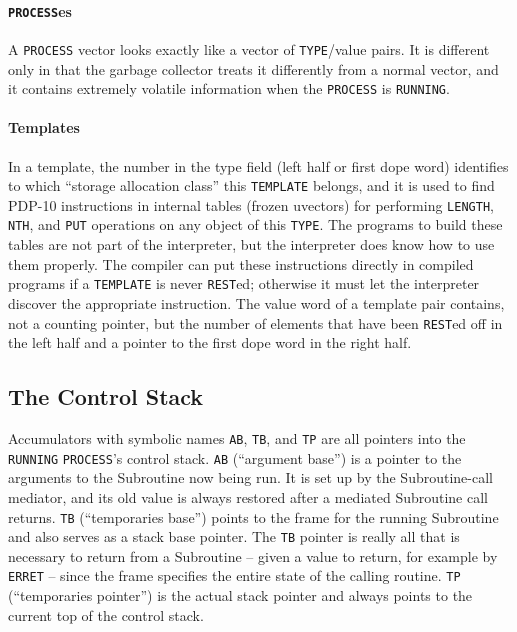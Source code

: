 \documentclass[a4paper,]{article}
\let\oldparagraph\paragraph
\renewcommand{\paragraph}[1]{\oldparagraph{#1}\mbox{}}
\begin{document}
\paragraph{\texorpdfstring{\texttt{PROCESS}es}{PROCESSes}}\label{processes}

A \texttt{PROCESS} vector looks exactly like a vector of \texttt{TYPE}/value pairs. It is different only in that the
garbage collector treats it differently from a normal vector, and it contains extremely volatile information when the
\texttt{PROCESS} is \texttt{RUNNING}.

\paragraph{Templates}\label{templates}

In a template, the number in the type field (left half or first dope word) identifies to which ``storage allocation class''
this \texttt{TEMPLATE} belongs, and it is used to find PDP-10 instructions in internal tables (frozen uvectors) for
performing \texttt{LENGTH}, \texttt{NTH}, and \texttt{PUT} operations on any object of this \texttt{TYPE}. The programs to
build these tables are not part of the interpreter, but the interpreter does know how to use them properly. The compiler
can put these instructions directly in compiled programs if a \texttt{TEMPLATE} is never \texttt{REST}ed; otherwise it must
let the interpreter discover the appropriate instruction. The value word of a template pair contains, not a counting
pointer, but the number of elements that have been \texttt{REST}ed off in the left half and a pointer to the first dope
word in the right half.

\subsection{The Control Stack}\label{the-control-stack}

Accumulators with symbolic names \texttt{AB}, \texttt{TB}, and \texttt{TP} are all pointers into the \texttt{RUNNING}
\texttt{PROCESS}'s control stack. \texttt{AB} (``argument base'') is a pointer to the arguments to the Subroutine now being
run. It is set up by the Subroutine-call mediator, and its old value is always restored after a mediated Subroutine call
returns. \texttt{TB} (``temporaries base'') points to the frame for the running Subroutine and also serves as a stack base
pointer. The \texttt{TB} pointer is really all that is necessary to return from a Subroutine -- given a value to return,
for example by \texttt{ERRET} -- since the frame specifies the entire state of the calling routine.
\texttt{TP} (``temporaries pointer'') is the actual stack pointer and always points to the current top of the control
stack.
\end{document}
